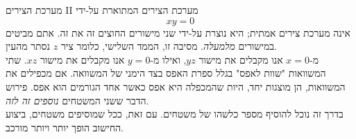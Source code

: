 \begin{surferPage}{מערכת הצירים II}
מערכת הצירים המתוארת על-ידי
\[xy=0\]
אינה מערכת צירים אמתית; היא נוצרת על-ידי שני מישורים החוצים זה את זה. אתם מביטים במישורים {\it מלמעלה}. מסיבה זו, הממד השלישי, כלומר ציר $z$ נסתר מהעין. \\
\vspace{0,3cm}
מ-$x=0$ אנו מקבלים את מישור $yz$, ואילו מ-$y=0$ אנו מקבלים את מישור $xz$.
שתי המשוואות  "שוות לאפס" בגלל ספרת האפס בצד הימני של המשוואה. אם מכפילים את המשוואות, הן מוצגות יחד, היות שהמכפלה היא אפס כאשר אחד הגורמים הוא אפס. פירוש הדבר ששני המשטחים {\it נוספים זה לזה}. \\
בדרך זה נוכל להוסיף מספר כלשהו של משטחים. עם זאת, ככל שמוסיפים משטחים, ביצוע החישוב הופך יותר ויותר מורכב.
\end{surferPage}
